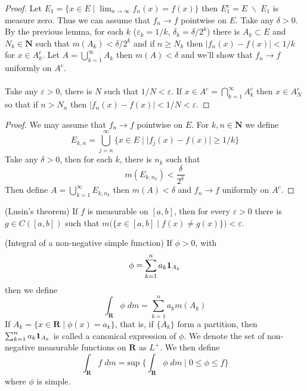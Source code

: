 \vspace{2ex}
\begin{proof}
Let $E_1=\{x\in E \;|\; \lim _{n\rightarrow \infty }f_{n}(x)=f(x)\}$ then $E_{1}^{c}=E\;\backslash\;E_{1}$ is measure zero. Thus we can assume that $f_{n}\rightarrow f$ pointwise on $E$. Take any $\delta >0$. By the previous lemma, for each $k$ ($\varepsilon _{k}=1/k$, $\delta _{k}=\delta /2^{k}$) there is $A_{k}\subset E$ and $N_{k}\in {\bm N}$ such that $m(A_{k})<\delta /2^{k}$ and if $n\geq N_{k}$ then $|f_{n}(x)-f(x)|<1/k$ for $x\in A^{c}_{k}$. Let $A=\bigcup ^{\infty }_{k=1}A_{k}$ then $m(A)<\delta $ and we'll show that $f_{n}\rightarrow f$ uniformly on $A^{c}$. 
\\\\
Take any $\varepsilon >0$, there is $N$ such that $1/N<\varepsilon $. If $x\in A^{c}=\bigcap ^{\infty }_{k=1}A^{c}_{k}$ then $x\in A_{N}^{c}$ so that if $n>N_{n}$ then $|f_{n}(x)-f(x)|<1/N<\varepsilon $. 
\end{proof}
\vspace{2ex}
\begin{proof}
We may assume that $f_{n}\rightarrow f$ pointwise on $E$. For $k,n\in {\bm N}$ we define
\[E_{k,n}=\bigcup _{j=n}^{\infty }\{x\in E \;|\; |f_{j}(x)-f(x)|\geq 1/k\}\]
Take any $\delta >0$, then for each $k$, there is $n_{k}$ such that 
\[m(E_{k,n_{k}})<\dfrac{\delta }{2^{k}}\]
Then define $A=\bigcup ^{\infty }_{k=1}E_{k,n_{k}}$ then $m(A)<\delta $ and $f_{n}\rightarrow f$ uniformly on $A^{c}$.
\end{proof}
\vspace{2ex}
\begin{thm}
(Lusin's theorem) If $f$ is measurable on $[a,b]$, then for every $\varepsilon >0$ there is $g\in C([a,b])$ such that $m\Big(\{x\in [a,b]\;|\; f(x)\ne g(x)\}\Big)<\varepsilon $.
\end{thm}
\vspace{2ex}
\begin{defi}
(Integral of a non-negative simple function) If $\phi >0$, with 
\[\phi =\sum ^{n}_{k=1}a_{k}{\bf 1} _{A_{k}}\]
then we define
\[\int _{{\bm R}}\phi \; dm=\sum ^{n}_{k=1}a_{k}m(A_{k})\]
If $A_{k}=\{x\in {\bm R} \;|\; \phi (x)=a_{k}\}$, that is, if $\{A_{k}\}$ form a partition, then $\sum ^{n}_{k=1}a_{k}{\bf 1} _{A_{k}}$ is called a canonical expression of $\phi $. We denote the set of non-negative measurable functions on ${\bm R}$ as $L^{+}$. We then define
\[\int _{{\bm R}}f\;dm=\mathrm{sup}\;\Big\{\int _{{\bm R}}\phi \;dm \;|\; 0\leq \phi \leq f\Big\}\]
where $\phi $ is simple.
\end{defi}
